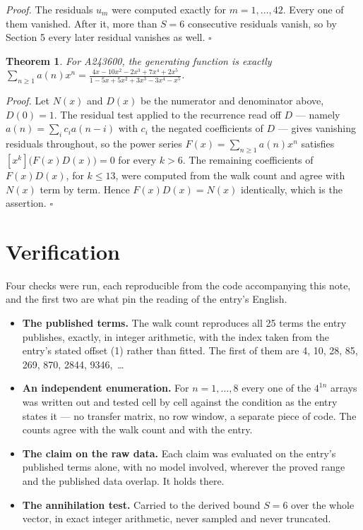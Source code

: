 \documentclass[11pt]{article}
\newtheorem{theorem}{Theorem}
\theoremstyle{definition}
\begin{document}
{\itshape Proof.} The residuals $u_m$ were computed exactly for $m = 1,\dots,42$. Every one of them vanished. After it, more than $S = 6$ consecutive residuals vanish, so by Section 5 every later residual vanishes as well. $\square$

\begin{theorem} For A243600, the generating function is exactly $\sum_{n\ge 1} a(n)x^n = \frac{4x - 10x^{2} - 2x^{3} + 7x^{4} + 2x^{5}}{1 - 5x + 5x^{2} + 3x^{3} - 3x^{4} - x^{5}}$.\end{theorem}

{\itshape Proof.} Let $N(x)$ and $D(x)$ be the numerator and denominator above, $D(0)=1$. The residual test applied to the recurrence read off $D$ --- namely $a(n) = \sum_i c_i a(n-i)$ with $c_i$ the negated coefficients of $D$ --- gives vanishing residuals throughout, so the power series $F(x)=\sum_{n\ge 1}a(n)x^n$ satisfies $[x^k]\bigl(F(x)D(x)\bigr) = 0$ for every $k > 6$. The remaining coefficients of $F(x)D(x)$, for $k \le 13$, were computed from the walk count and agree with $N(x)$ term by term. Hence $F(x)D(x) = N(x)$ identically, which is the assertion. $\square$

\section{Verification}

Four checks were run, each reproducible from the code accompanying this note, and the first two are what pin the reading of the entry's English.

\begin{itemize}

\item {\bfseries The published terms.} The walk count reproduces all 25 terms the entry publishes, exactly, in integer arithmetic, with the index taken from the entry's stated offset (1) rather than fitted. The first of them are 4, 10, 28, 85, 269, 870, 2844, 9346,~\dots

\item {\bfseries An independent enumeration.} For $n = 1,\dots,8$ every one of the $4^{1n}$ arrays was written out and tested cell by cell against the condition as the entry states it --- no transfer matrix, no row window, a separate piece of code. The counts agree with the walk count and with the entry.

\item {\bfseries The claim on the raw data.} Each claim was evaluated on the entry's published terms alone, with no model involved, wherever the proved range and the published data overlap. It holds there.

\item {\bfseries The annihilation test.} Carried to the derived bound $S = 6$ over the whole vector, in exact integer arithmetic, never sampled and never truncated.

\end{itemize}
\end{document}
